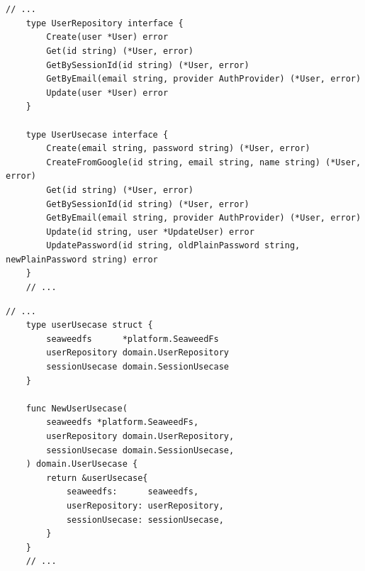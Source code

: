 \documentclass[12pt,one side,openright,a4paper]{cpe-thesis-th}
\begin{document}
    \centering{} \\


 \\

    \begin{lstlisting}[label={lst:appendix-user-domain}, caption={ชุดคำสั่งที่นิยาม Interface ของ User Repository และ User Usecase}]
    // ...
    type UserRepository interface {
        Create(user *User) error
        Get(id string) (*User, error)
        GetBySessionId(id string) (*User, error)
        GetByEmail(email string, provider AuthProvider) (*User, error)
        Update(user *User) error
    }
    
    type UserUsecase interface {
        Create(email string, password string) (*User, error)
        CreateFromGoogle(id string, email string, name string) (*User, error)
        Get(id string) (*User, error)
        GetBySessionId(id string) (*User, error)
        GetByEmail(email string, provider AuthProvider) (*User, error)
        Update(id string, user *UpdateUser) error
        UpdatePassword(id string, oldPlainPassword string, newPlainPassword string) error
    }
    // ...
    \end{lstlisting}
    
    \begin{lstlisting}[label={lst:appendix-user-usecase}, caption={ชุดคำสั่งสร้างและนิยาม UserUsecase ที่มีการ Implement UserRepository}]
    // ...
    type userUsecase struct {
        seaweedfs      *platform.SeaweedFs
        userRepository domain.UserRepository
        sessionUsecase domain.SessionUsecase
    }
    
    func NewUserUsecase(
        seaweedfs *platform.SeaweedFs,
        userRepository domain.UserRepository,
        sessionUsecase domain.SessionUsecase,
    ) domain.UserUsecase {
        return &userUsecase{
            seaweedfs:      seaweedfs,
            userRepository: userRepository,
            sessionUsecase: sessionUsecase,
        }
    }
    // ...
    \end{lstlisting}
    
\pagebreak
{}
 \\
\end{document}
